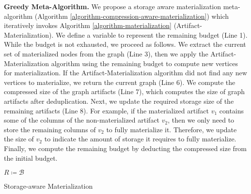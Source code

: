 \textbf{Greedy Meta-Algorithm.}
We propose a storage aware materialization meta-algorithm (Algorithm \ref{algorithm-compression-aware-materialization}) which iteratively invokes Algorithm \ref{algorithm-materialization} (Artifact-Materialization).
We define a variable to represent the remaining budget (Line 1).
While the budget is not exhausted, we proceed as follows.
We extract the current set of materialized nodes from the graph (Line 3), then we apply the Artifact-Materialization algorithm using the remaining budget to compute new vertices for materialization.
If the Artifact-Materialization algorithm did not find any new vertices to materialize, we return the current graph (Line 6).
We compute the compressed size of the graph artifacts (Line 7), which computes the size of graph artifacts after deduplication. 
Next, we update the required storage size of the remaining artifacts (Line 8).
For example, if the materialized artifact $v_1$ contains some of the columns of the non-materialized artifact $v_2$, then we only need to store the remaining columns of $v_2$ to fully materialize it.
Therefore, we update the size of $v_2$ to indicate the amount of storage it requires to fully materialize.
Finally, we compute the remaining budget by deducting the compressed size from the initial budget.

\begin{algorithm}[h]
$R \coloneqq  \mathcal{B}$ \;
\caption{Storage-aware Materialization}\label{algorithm-compression-aware-materialization}
\end{algorithm}


